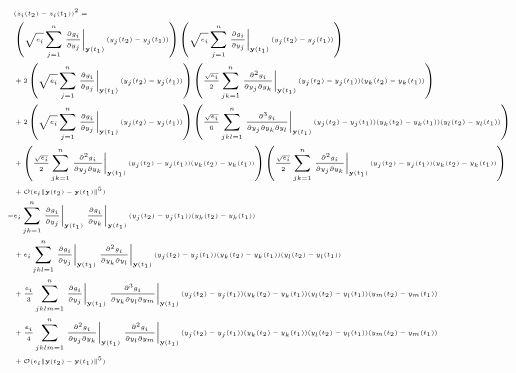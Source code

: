 \begin{equation}
\tiny
\begin{aligned}
& (z_i(t_2) - z_i(t_1))^2 = \\
& \left( \sqrt{e_i} \sum_{j=1}^n \left. \frac{\partial g_i}{\partial y_j} \right|_{\mathbf{y}(t_1)} (y_j(t_2)-y_j(t_1)) \right) \left( \sqrt{e_i} \sum_{j=1}^n \left. \frac{\partial g_i}{\partial y_j} \right|_{\mathbf{y}(t_1)} (y_j(t_2)-y_j(t_1)) \right) \\
&+ 2 \left( \sqrt{e_i} \sum_{j=1}^n \left. \frac{\partial g_i}{\partial y_j} \right|_{\mathbf{y}(t_1)} (y_j(t_2)-y_j(t_1)) \right) \left( \frac{\sqrt{e_i}}{2} \sum_{jk=1}^n \left. \frac{\partial^2 g_i}{\partial y_j \partial y_k} \right|_{\mathbf{y}(t_1)} (y_j(t_2)-y_j(t_1)) (y_k(t_2)-y_k(t_1)) \right) \\
&+ 2 \left( \sqrt{e_i} \sum_{j=1}^n \left. \frac{\partial g_i}{\partial y_j} \right|_{\mathbf{y}(t_1)} (y_j(t_2)-y_j(t_1)) \right) \left( \frac{\sqrt{e_i}}{6} \sum_{jkl=1}^n \left. \frac{\partial^3 g_i}{\partial y_j \partial y_k \partial y_l} \right|_{\mathbf{y}(t_1)} (y_j(t_2)-y_j(t_1)) (y_k(t_2)-y_k(t_1)) (y_l(t_2)-y_l(t_1)) \right) \\
&+ \left( \frac{\sqrt{e_i}}{2} \sum_{jk=1}^n \left. \frac{\partial^2 g_i}{\partial y_j \partial y_k} \right|_{\mathbf{y}(t_1)} (y_j(t_2)-y_j(t_1)) (y_k(t_2)-y_k(t_1)) \right) \left( \frac{\sqrt{e_i}}{2} \sum_{jk=1}^n \left. \frac{\partial^2 g_i}{\partial y_j \partial y_k} \right|_{\mathbf{y}(t_1)} (y_j(t_2)-y_j(t_1)) (y_k(t_2)-y_k(t_1)) \right) \\
&+ \mathcal{O}( e_i \|\mathbf{y}(t_2) - \mathbf{y}(t_1) \|^5) \\
=& e_i \sum_{jk=1}^n \left. \frac{\partial g_i}{\partial y_j} \right|_{\mathbf{y}(t_1)} \left. \frac{\partial g_i}{\partial y_k} \right|_{\mathbf{y}(t_1)} (y_j(t_2)-y_j(t_1)) (y_k(t_2)-y_k(t_1)) \\
&+ e_i \sum_{jkl=1}^n \left. \frac{\partial g_i}{\partial y_j} \right|_{\mathbf{y}(t_1)} \left. \frac{\partial^2 g_i}{\partial y_k \partial y_l} \right|_{\mathbf{y}(t_1)} (y_j(t_2)-y_j(t_1))  (y_k(t_2)-y_k(t_1)) (y_l(t_2)-y_l(t_1)) \\
&+ \frac{e_i}{3} \sum_{jklm=1}^n \left. \frac{\partial g_i}{\partial y_j} \right|_{\mathbf{y}(t_1)} \left. \frac{\partial^3 g_i}{ \partial y_k \partial y_l \partial y_m} \right|_{\mathbf{y}(t_1)} (y_j(t_2)-y_j(t_1)) (y_k(t_2)-y_k(t_1)) (y_l(t_2)-y_l(t_1))(y_m(t_2)-y_m(t_1)) \\
&+ \frac{e_i}{4} \sum_{jklm=1}^n \left. \frac{\partial^2 g_i}{\partial y_j \partial y_k} \right|_{\mathbf{y}(t_1)} \left. \frac{\partial^2 g_i}{\partial y_l \partial y_m} \right|_{\mathbf{y}(t_1)} (y_j(t_2)-y_j(t_1)) (y_k(t_2)-y_k(t_1)) (y_l(t_2)-y_l(t_1)) (y_m(t_2)-y_m(t_1)) \\
&+ \mathcal{O}(e_i \|\mathbf{y}(t_2) - \mathbf{y}(t_1) \|^5)
\end{aligned}
\end{equation}
